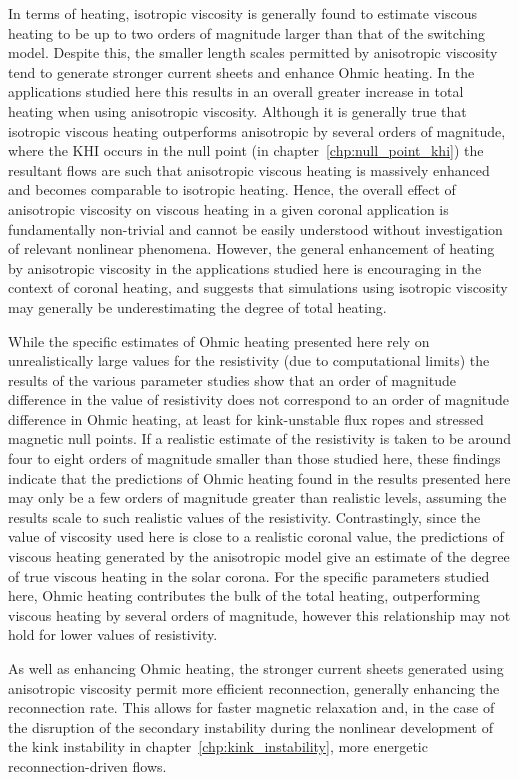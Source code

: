 In terms of heating, isotropic viscosity is generally found to estimate viscous heating to be up to two orders of magnitude larger than that of the switching model. Despite this, the smaller length scales permitted by anisotropic viscosity tend to generate stronger current sheets and enhance Ohmic heating. In the applications studied here this results in an overall greater increase in total heating when using anisotropic viscosity. Although it is generally true that isotropic viscous heating outperforms anisotropic by several orders of magnitude, where the KHI occurs in the null point (in chapter~\ref{chp:null_point_khi}) the resultant flows are such that anisotropic viscous heating is massively enhanced and becomes comparable to isotropic heating. Hence, the overall effect of anisotropic viscosity on viscous heating in a given coronal application is fundamentally non-trivial and cannot be easily understood without investigation of relevant nonlinear phenomena. However, the general enhancement of heating by anisotropic viscosity in the applications studied here is encouraging in the context of coronal heating, and suggests that simulations using isotropic viscosity may generally be underestimating the degree of total heating.

While the specific estimates of Ohmic heating presented here rely on unrealistically large values for the resistivity (due to computational limits) the results of the various parameter studies show that an order of magnitude difference in the value of resistivity does not correspond to an order of magnitude difference in Ohmic heating, at least for kink-unstable flux ropes and stressed magnetic null points. If a realistic estimate of the resistivity is taken to be around four to eight orders of magnitude smaller than those studied here, these findings indicate that the predictions of Ohmic heating found in the results presented here may only be a few orders of magnitude greater than realistic levels, assuming the results scale to such realistic values of the resistivity. Contrastingly, since the value of viscosity used here is close to a realistic coronal value, the predictions of viscous heating generated by the anisotropic model give an estimate of the degree of true viscous heating in the solar corona. For the specific parameters studied here, Ohmic heating contributes the bulk of the total heating, outperforming viscous heating by several orders of magnitude, however this relationship may not hold for lower values of resistivity. 

As well as enhancing Ohmic heating, the stronger current sheets generated using anisotropic viscosity permit more efficient reconnection, generally enhancing the reconnection rate. This allows for faster magnetic relaxation and, in the case of the disruption of the secondary instability during the nonlinear development of the kink instability in chapter~\ref{chp:kink_instability}, more energetic reconnection-driven flows.

